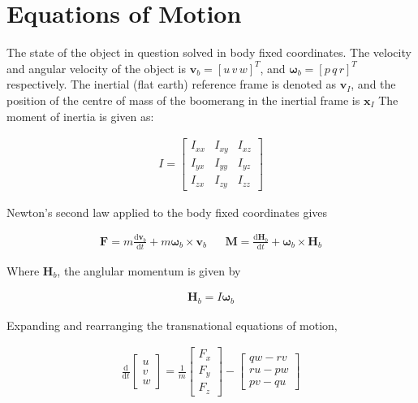 \documentclass[11pt, twoside]{article}
\numberwithin{equation}{section}
\renewcommand{\vec}{\mathbf}
\begin{document}
\section{Equations of Motion}
The state of the object in question solved in body fixed coordinates. The velocity and angular velocity of the object is \(\vec{v}_b = \left[u \, v \, w\right]^T\), and \( \vec{\omega}_b = \left[ p \,  q \, r \right]^T \) respectively. The inertial (flat earth) reference frame is denoted as \(\vec{v}_I\), and the position of the centre of mass of the boomerang in the inertial frame is \(\vec{x}_I\) The moment of inertia is given as:

\begin{align}
	I = 
	\begin{bmatrix}
		I_{xx} & I_{xy} & I_{xz} \\
		I_{yx} & I_{yy} & I_{yz} \\
		I_{zx} & I_{zy} & I_{zz}
	\end{bmatrix}
\end{align}

Newton's second law applied to the body fixed coordinates gives

\begin{align}
	\vec{F} = m \frac{\mathrm{d} \vec{v}_b }{\mathrm{d}t} + m\vec{\omega}_b \times \vec{v}_b & & \vec{M} =\frac{\mathrm{d}\vec{H}_b}{\mathrm{d}t} + \vec{\omega}_b \times \vec{H}_b
\end{align}

Where \(\vec{H}_b\), the anglular momentum is given by

\begin{align}
	\vec{H}_b = I\vec{\omega}_b
\end{align}

Expanding and rearranging the transnational equations of motion,

\begin{align}
	\frac{\mathrm{d}}{\mathrm{d}t}
	\begin{bmatrix}
		u \\ v \\ w
	\end{bmatrix}
	=
	\frac{1}{m}
	\begin{bmatrix}
		F_x \\ F_y \\ F_z
	\end{bmatrix}
	-
	\begin{bmatrix}
		qw - rv \\ ru -pw \\ pv - qu
	\end{bmatrix}
\end{align}
\end{document}
